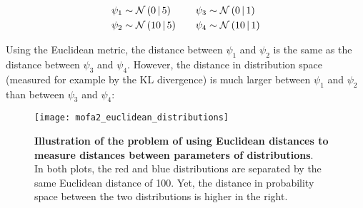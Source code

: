 \begin{equation}
	\begin{split}
		\psi_1 &\sim \mathcal{N}\left(0 \,|\, 5\right) \\
		\psi_2 &\sim \mathcal{N}\left(10 \,|\, 5\right)
	\end{split}
	\qquad
	\begin{split}
		\psi_3 &\sim \mathcal{N}\left(0 \,|\, 1\right) \\
		\psi_4 &\sim \mathcal{N}\left(10 \,|\, 1\right)
	\end{split}
\end{equation}

Using the Euclidean metric, the distance between $\psi_1$ and $\psi_2$ is the same as the distance between $\psi_3$ and $\psi_4$. However, the distance in distribution space (measured for example by the KL divergence) is much larger between $\psi_1$ and $\psi_2$ than between $\psi_3$ and $\psi_4$:

\begin{figure}[!h]
	\begin{center}
		\texttt{[image: mofa2\_euclidean\_distributions]}
		\caption{\textbf{Illustration of the problem of using Euclidean distances to measure distances between parameters of distributions}.\\
		In both plots, the red and blue distributions are separated by the same Euclidean distance of 100. Yet, the distance in probability space between the two distributions is higher in the right.
		}
		\label{fig:mofa2_euclidean_distributions}
	\end{center}
\end{figure}

